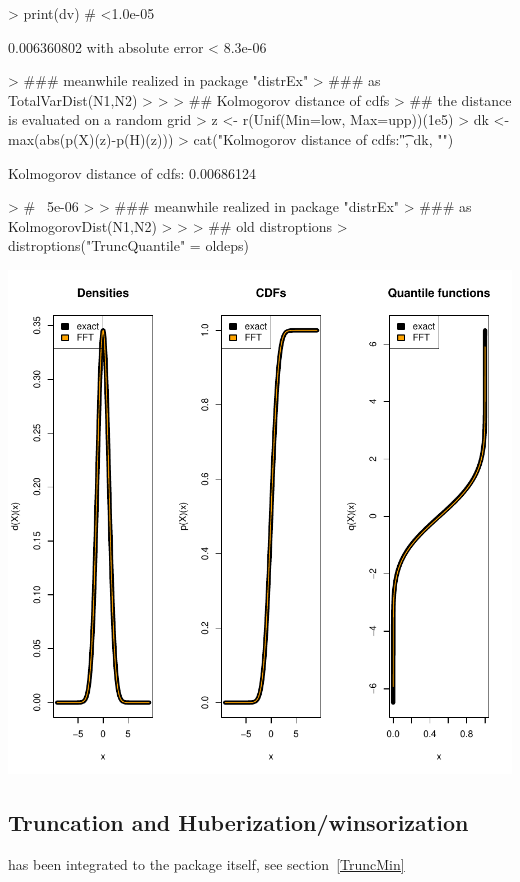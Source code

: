 \documentclass[11pt]{article}
\begin{document}
\begin{Schunk}
\begin{Soutput}
\end{Soutput}
\begin{Sinput}
> print(dv) # <1.0e-05
\end{Sinput}
\begin{Soutput}
0.006360802 with absolute error < 8.3e-06
\end{Soutput}
\begin{Sinput}
> ### meanwhile realized in package "distrEx"
> ### as TotalVarDist(N1,N2)
>
>
> ## Kolmogorov distance of cdfs
> ## the distance is evaluated on a random grid
> z <- r(Unif(Min=low, Max=upp))(1e5)
> dk <- max(abs(p(X)(z)-p(H)(z)))
> cat("Kolmogorov distance of cdfs:\t", dk, "\n")
\end{Sinput}
\begin{Soutput}
Kolmogorov distance of cdfs:     0.00686124
\end{Soutput}
\begin{Sinput}
> # ~5e-06
>
> ### meanwhile realized in package "distrEx"
> ### as KolmogorovDist(N1,N2)
>
>
> ## old distroptions
> distroptions("TruncQuantile" = oldeps)
\end{Sinput}
\end{Schunk}
\includegraphics{distr-StationaryRegressorDistr}
\subsection{Truncation and Huberization/winsorization}\label{truncex}
has been integrated to the package itself, see section~\ref{TruncMin}
\end{document}
